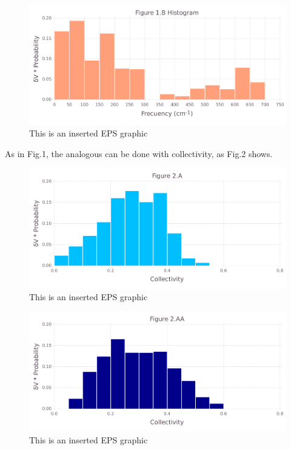 \documentclass[10pt,letterpaper]{article}
\begin{document}
\begin{figure}[ht]
\begin{center}
\includegraphics[scale=0.5]{256l/1bfigure.pdf}
\caption{This is an inserted EPS graphic}
\label{fig2}
\end{center}
\end{figure}

\clearpage
As in Fig.1, the analogous can be done with collectivity, as Fig.2 shows.

\begin{figure}[ht]
\begin{center}
\includegraphics[scale=0.5]{256l/2afigure.pdf}
\caption{This is an inserted EPS graphic}
\label{fig3}
\end{center}
\end{figure}

\begin{figure}[ht]
\begin{center}
\includegraphics[scale=0.5]{256l/2aafigure.pdf}
\caption{This is an inserted EPS graphic}
\label{fig4}
\end{center}
\end{figure}
\end{document}
